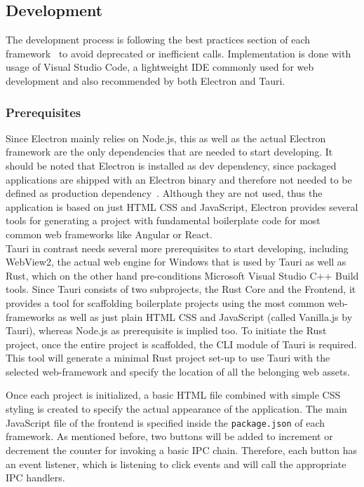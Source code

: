 
\subsection{Development}
\label{subsec:impl:dev}
The development process is following the best practices section of each framework~\cite{ElectronDoc,tauri} to avoid deprecated or inefficient calls.
Implementation is done with usage of Visual Studio Code, a lightweight \ac{IDE} commonly used for web development and also recommended by both Electron and Tauri.

\subsubsection{Prerequisites}

Since Electron mainly relies on Node.js, this as well as the actual Electron framework are the only dependencies that are needed to start developing.
It should be noted that Electron is installed as dev dependency, since packaged applications are shipped with an Electron binary and therefore not needed to be defined as production dependency~\cite{electron-in-action}.
Although they are not used, thus the application is based on just \ac{HTML} \ac{CSS} and JavaScript, Electron provides several tools for generating a project with fundamental boilerplate code for most common web frameworks like Angular or React.\\
Tauri in contrast needs several more prerequisites to start developing, including WebView2, the actual web engine for Windows that is used by Tauri as well as Rust, which on the other hand pre-conditions Microsoft Visual Studio C++ Build tools.
Since Tauri consists of two subprojects, the Rust Core and the Frontend, it provides a tool for scaffolding boilerplate projects using the most common web-frameworks as well as just plain \ac{HTML} \ac{CSS} and JavaScript (called Vanilla.js by Tauri),
whereas Node.js as prerequisite is implied too.
To initiate the Rust project, once the entire project is scaffolded, the CLI module of Tauri is required.
This tool will generate a minimal Rust project set-up to use Tauri with the selected web-framework and specify the location of all the belonging web assets.

Once each project is initialized, a basic \ac{HTML} file combined with simple \ac{CSS} styling is created to specify the actual appearance of the application.
The main JavaScript file of the frontend is specified inside the \texttt{package.json} of each framework.
As mentioned before, two buttons will be added to increment or decrement the counter for invoking a basic \ac{IPC} chain.
Therefore, each button has an event listener, which is listening to click events and will call the appropriate \ac{IPC} handlers.

